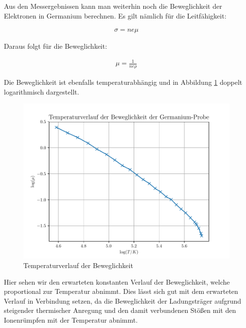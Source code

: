 Aus den Messergebnissen kann man weiterhin noch die Beweglichkeit der Elektronen in Germanium berechnen. Es gilt nämlich für die Leitfähigkeit:

\begin{align}
\sigma=ne\mu
\end{align}

Daraus folgt für die Beweglichkeit:

\begin{align}
\mu=\frac{1}{ne\rho}
\end{align}

Die Beweglichkeit ist ebenfalls temperaturabhängig und in Abbildung \ref{mu} doppelt logarithmisch dargestellt.

\begin{figure}[htbp] 
     \includegraphics[scale=0.7]{temp_mu.pdf}
  \caption{Temperaturverlauf der Beweglichkeit}
  \label{mu}
\end{figure}

Hier sehen wir den erwarteten konstanten Verlauf der Beweglichkeit, welche proportional zur Temperatur abnimmt. Dies lässt sich gut mit dem erwarteten Verlauf in Verbindung setzen, da die Beweglichkeit der Ladungsträger aufgrund steigender thermischer Anregung und den damit verbundenen Stößen mit den Ionenrümpfen mit der Temperatur abnimmt. 